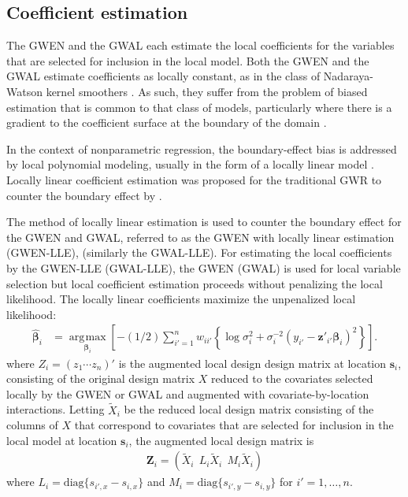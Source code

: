 \documentclass[authoryear, review, 11pt]{elsarticle}
\DeclareMathOperator*{\argmax}{\arg\!\max}
\begin{document}
	\subsection{Coefficient estimation}\label{section:LLE}
	The GWEN and the GWAL each estimate the local coefficients for the variables that are selected for inclusion in the local model. Both the GWEN and the GWAL estimate coefficients as locally constant, as in the class of Nadaraya-Watson kernel smoothers \citep{Hardle-1990}. As such, they suffer from the problem of biased estimation that is common to that class of models, particularly where there is a gradient to the coefficient surface at the boundary of the domain \citep{Hastie:1993b}.

    In the context of nonparametric regression, the boundary-effect bias is addressed by local polynomial modeling, usually in the form of a locally linear model \citep{Fan-1996}. Locally linear coefficient estimation was proposed for the traditional GWR to counter the boundary effect by \cite{Wang:2008b}.

    The method of locally linear estimation is used to counter the boundary effect for the GWEN and GWAL, referred to as the GWEN with locally linear estimation (GWEN-LLE), (similarly the GWAL-LLE). For estimating the local coefficients by the GWEN-LLE (GWAL-LLE), the GWEN (GWAL) is used for local variable selection but local coefficient estimation proceeds without penalizing the local likelihood. The locally linear coefficients maximize the unpenalized local likelihood:
	\begin{align} \label{eq:coefficients}
		\hat{\bm{\beta}}_i &= \argmax \limits_{\bm{\beta}_i} \left[-(1/2) \sum_{i'=1}^n w_{ii'} \left\{ \log{\sigma^2_i}  + \sigma^{-2}_i  \left(y_{i'} - \bm{z}'_{i'} \bm{\beta}_i \right)^2 \right\}\right].
	\end{align}
	where $Z_i  = \left(z_1 \cdots z_n\right)'$ is the augmented local design design matrix at location $\bm{s}_i$, consisting of the original design matrix $X$ reduced to the covariates selected locally by the GWEN or GWAL and augmented with covariate-by-location interactions. Letting $\tilde{X}_i$ be the reduced local design matrix consisting of the columns of $X$ that correspond to covariates that are selected for inclusion in the local model at location $\bm{s}_i$, the augmented local design matrix is
	\begin{align}
		\bm{Z}_i = \left( \tilde{X}_i  \:\: L_i \tilde{X}_i \:\: M_i \tilde{X}_i \right)
	\end{align}
	where $L_i = \text{diag}\{s_{i',x} - s_{i,x}\}$ and $M_i = \text{diag}\{s_{i',y} - s_{i,y}\}$ for $i' = 1, \dots, n$.
	 
\end{document}
